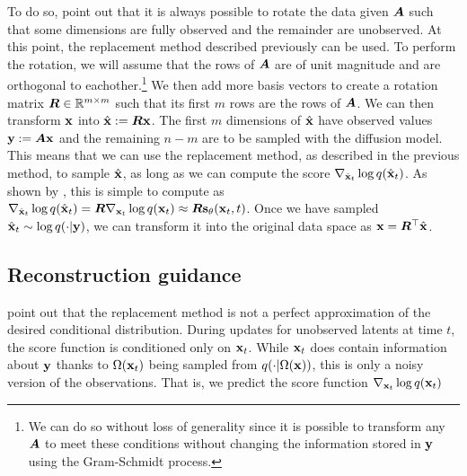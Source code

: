 To do so, \citet{song2020score} point out that it is always possible to rotate the data given ${\bm{A}}$ such that some dimensions are fully observed and the remainder are unobserved. At this point, the replacement method described previously can be used. To perform the rotation, we will assume that the rows of ${\bm{A}}$ are of unit magnitude and are orthogonal to eachother.\footnote{We can do so without loss of generality since it is possible to transform any ${\bm{A}}$ to meet these conditions without changing the information stored in ${\mathbf{y}}$ using the Gram-Schmidt process.} We then add more basis vectors to create a rotation matrix ${\bm{R}} \in \mathbb{R}^{m \times m}$ such that its first $m$ rows are the rows of ${\bm{A}}$. We can then transform ${\mathbf{x}}$ into $\hat{{\mathbf{x}}} := {\bm{R}} {\mathbf{x}}$. The first $m$ dimensions of $\hat{{\mathbf{x}}}$ have observed values ${\mathbf{y}} := {\bm{A}}{\mathbf{x}}$ and the remaining $n-m$ are to be sampled with the diffusion model. This means that we can use the replacement method, as described in the previous method, to sample $\hat{{\mathbf{x}}}$, as long as we can compute the score $\nabla_{\hat{{\mathbf{x}}}_t} \log q(\hat{{\mathbf{x}}}_t)$. As shown by \citet{song2020score}, this is simple to compute as $\nabla_{\hat{{\mathbf{x}}}_t} \log q(\hat{{\mathbf{x}}}_t) = {\bm{R}} \nabla_{{\mathbf{x}}_t} \log q({\mathbf{x}}_t) \approx {\bm{R}} {\mathbf{s}}_\theta({\mathbf{x}}_t, t)$. Once we have sampled $\hat{{\mathbf{x}}}_t \sim \log q(\cdot | {\mathbf{y}})$, we can transform it into the original data space as ${\mathbf{x}} = {\bm{R}}^\top \hat{{\mathbf{x}}}$.

\subsection{Reconstruction guidance}
\citet{ho2022video} point out that the replacement method is not a perfect approximation of the desired conditional distribution. During updates for unobserved latents at time $t$, the score function is conditioned only on ${\mathbf{x}}_t$. While ${\mathbf{x}}_t$ does contain information about ${\mathbf{y}}$ thanks to $\Omega({\mathbf{x}}_t)$ being sampled from $q(\cdot | \Omega({\mathbf{x}}))$, this is only a noisy version of the observations. That is, we predict the score function $\nabla_{{\mathbf{x}}_t} \log q({\mathbf{x}}_t)$ 

